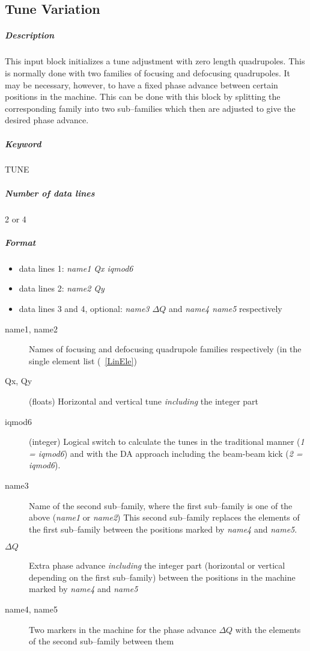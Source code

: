 \documentclass[a4paper,11pt]{report}
\begin{document}
\subsection{Tune Variation} \label{TunVar}

\subparagraph{Description} This input block initializes a tune
adjustment with zero length quadrupoles.  This is normally done with
two families of focusing and defocusing quadrupoles. It may be
necessary, however, to have a fixed phase advance between certain
positions in the machine. This can be done with this block by
splitting the corresponding family into two sub--families which then
are adjusted to give the desired phase advance.

\subparagraph{Keyword} TUNE \subparagraph{Number of data lines} 2 or 4

\subparagraph{Format}
\begin{itemize}
\item data lines 1: {\em name1 Qx iqmod6}
\item data lines 2: {\em name2 Qy}
\item data lines 3 and 4, optional: {\em name3 $\Delta Q$} \/and {\em
    name4 name5} \/respectively
\end{itemize}

\begin{description}
\item [name1, name2] Names of focusing and defocusing quadrupole
  families respectively (in the single element list (~\ref{LinEle})
\item [Qx, Qy] (floats) Horizontal and vertical tune {\em including}
  \/the integer part
\item [iqmod6] (integer) Logical switch to calculate the tunes in the
  traditional manner ({\it 1 = iqmod6}) and with the DA approach
  including the beam-beam kick ({\it 2 = iqmod6}).
\item [name3] Name of the second sub--family, where the first
  sub--family is one of the above ({\em name1} \/or {\em name2}\/)
  This second sub--family replaces the elements of the first
  sub--family between the positions marked by {\em name4} \/and {\em
    name5}\/.
\item [$\Delta Q$] Extra phase advance {\em including} \/the integer
  part (horizontal or vertical depending on the first sub--family)
  between the positions in the machine marked by {\em name4} \/and
  {\em name5}
\item [name4, name5] Two markers in the machine for the phase advance
  $\Delta Q$ with the elements of the second sub--family between them
\end{description}
\end{document}
